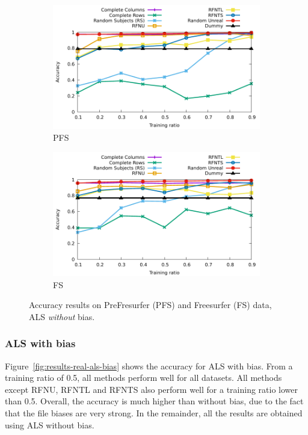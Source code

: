 \documentclass[10pt, conference, compsocconf]{IEEEtran}
\begin{document}
\begin{figure}
\begin{subfigure}[b]{0.5\columnwidth}
        \includegraphics[width=\textwidth]{data/results/means_of_results/ALS/PreFreeSurfer/ALS-PFS-6v7.pdf}
        \caption{PFS}
\end{subfigure}\hfill
\begin{subfigure}[b]{0.5\columnwidth}
        \includegraphics[width=\textwidth]{data/results/means_of_results/ALS/FS-100files/ALS-FS100files.pdf}
        \caption{FS}
\end{subfigure}
\caption{Accuracy results on PreFresurfer (PFS) and Freesurfer (FS) data, ALS \emph{without} bias.}
\label{fig:results-real-als}
\end{figure}

\subsubsection{ALS with bias}

Figure~\ref{fig:results-real-als-bias} shows the accuracy for ALS with 
bias. From a training ratio of 0.5, all methods perform well for all 
datasets. All methods except RFNU, RFNTL and 
RFNTS also perform well for a training ratio lower than 0.5. Overall, 
the accuracy is much higher than without bias, due to the fact that the 
file biases are very strong. In the remainder, all the 
results are obtained using ALS without bias.
\end{document}
